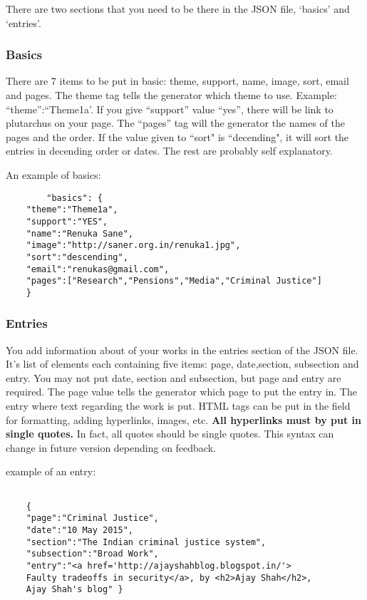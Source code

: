 \documentclass[12pt]{article}
\begin{document}
    There are two sections that you need to be there in the JSON file, `basics' and `entries'.
    
    \subsubsection{Basics}
    
    There are 7 items to be put in basic: theme, support, name, image, sort, email and pages. The theme tag tells the generator which theme to use. Example: ``theme'':``Theme1a'. If you give ``support'' value ``yes'', there will be link to plutarchus on your page. The ``pages'' tag will the generator the names of the pages and the order. If the value given to ``sort" is ``decending", it will sort the entries in decending order or dates. The rest are probably self explanatory. 

    An example of basics: 
    \begin{verbatim}
        "basics": {
    "theme":"Theme1a",
    "support":"YES",
    "name":"Renuka Sane",
    "image":"http://saner.org.in/renuka1.jpg",
    "sort":"descending",
    "email":"renukas@gmail.com",
    "pages":["Research","Pensions","Media","Criminal Justice"]
    }
    \end{verbatim}

    \subsubsection{Entries}

    You add information about of your works in the entries section of the JSON file. It's list of elements each containing five items: page, date,section, subsection and entry.  You may not put date, section and subsection, but page and entry are required. The page value tells the generator which page to put the entry in. The entry where text regarding the work is put. HTML tags can be put in the field for formatting, adding hyperlinks, images, etc. \textbf{All hyperlinks must by put in single quotes.} In fact, all quotes should be single quotes. This syntax can change in future version depending on feedback. 

    example of an entry: 
    \begin{verbatim}

    {
    "page":"Criminal Justice",
    "date":"10 May 2015",
    "section":"The Indian criminal justice system",
    "subsection":"Broad Work",
    "entry":"<a href='http://ajayshahblog.blogspot.in/'>
    Faulty tradeoffs in security</a>, by <h2>Ajay Shah</h2>,
    Ajay Shah's blog" }
    
    \end{verbatim}
\end{document}
